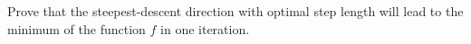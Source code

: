 Prove that the steepest-descent direction with optimal step length will lead to the minimum of the function $f$ in one
iteration.

\begin{solution}
    \ \\
    \vfill
\end{solution}